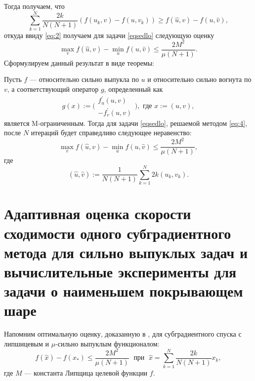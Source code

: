     Тогда получаем, что
    \begin{equation}
        \sum_{k=1}^{N} \frac{2k}{N(N+1)} (f(u_k, v) - f(u, v_k)) \geq f(\widehat{u}, v) - f(u, \widehat{v}), 
    \end{equation}
    откуда ввиду \eqref{eq:2} получаем для задачи \eqref{eqsedlo} следующую оценку
    \begin{equation}
        \max_{v} f(\widehat{u}, v) - \min_{u} f(u, \widehat{v}) \leq \frac{2M^2}{\mu (N+1)}.
    \end{equation}
    Сформулируем данный результат в виде теоремы:
    \begin{theorem}
        Пусть $f$ --- относительно сильно выпукла по $u$ и относительно сильно вогнута по $v$, а соответствующий оператор $g$, определенный как
        \[
            g(x) := \Bigg( 
                \begin{aligned}
                    f^{'}_{u}(u,v)\\
                    -f^{'}_{v}(u,v)
                \end{aligned}
            \Bigg), \text{ где } x := (u, v),
        \]
        является M-ограниченным. Тогда для задачи \eqref{eqsedlo}, решаемой методом \eqref{eq:4}, после $N$ итераций будет справедливо следующее неравенство:
        \begin{equation}
            \max_{v} f(\widehat{u}, v) - \min_{u} f(u, \widehat{v}) \leq \frac{2M^2}{\mu (N+1)},
        \end{equation}
        где
        \[
            (\widehat{u}, \widehat{v}) := \frac{1}{N(N+1)} \sum_{k=1}^{N} 2k (u_k,v_k).
        \]
    \end{theorem}

\section{Адаптивная оценка скорости сходимости одного субградиентного метода для сильно выпуклых задач и вычислительные эксперименты для задачи о наименьшем покрывающем шаре}  \label{sec:ch2/sec4}

Напомним оптимальную оценку, доказанную в \cite{Bach_2012}, для субградиентного спуска с липшицевым и $\mu$-сильно выпуклым функционалом:
\begin{equation}\label{orig_estimation_f}
    f(\widehat{x}) - f(x_*) \leq \frac{2 M^2}{\mu (N+1)}  \; \text{  при   } \; \widehat{x} = \sum\limits_{k=1}^{N} \frac{2 k}{N (N+1)} x_k, 
\end{equation}
где $M$ --- константа Липщица целевой функции $f$.

